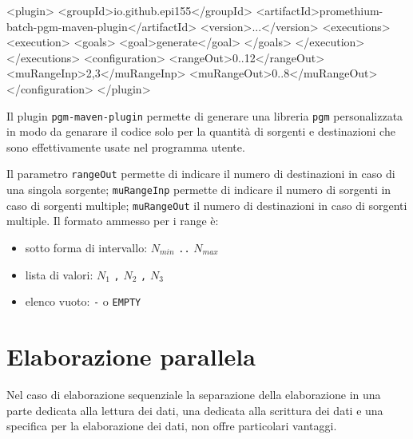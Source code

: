 \begin{elisting}[!htb]
\begin{xmlcode}
<plugin>
    <groupId>io.github.epi155</groupId>
    <artifactId>promethium-batch-pgm-maven-plugin</artifactId>
    <version>...</version>
    <executions>
        <execution>
            <goals>
                <goal>generate</goal>
            </goals>
        </execution>
    </executions>
    <configuration>
        <rangeOut>0..12</rangeOut>
        <muRangeInp>2,3</muRangeInp>
        <muRangeOut>0..8</muRangeOut>
    </configuration>
</plugin>
\end{xmlcode}
\caption{plugin per generare il codice della libreria}
\label{lst:plugin-conf}
\end{elisting}
Il plugin \texttt{pgm-maven-plugin} permette di generare una libreria
\texttt{pgm} personalizzata in modo da genarare il codice solo per la quantità
di sorgenti e destinazioni che sono effettivamente usate nel programma utente.

Il parametro \texttt{rangeOut} permette di indicare il numero di destinazioni in
caso di una singola sorgente; \texttt{muRangeInp} permette di indicare il numero
di sorgenti in caso di sorgenti multiple; \texttt{muRangeOut} il numero di
destinazioni in caso di sorgenti multiple.
Il formato ammesso per i range è:
\begin{itemize}
\item sotto forma di intervallo: $N_{min}$ \verb!..! $N_{max}$
\item lista di valori: $N_1$ \verb!,! $N_2$ \verb!,! $N_3$
\item elenco vuoto: \verb!-! o \verb!EMPTY!
\end{itemize}


\section{Elaborazione parallela} \label{sec:exePar}

Nel caso di elaborazione sequenziale la separazione della elaborazione in una
parte dedicata alla lettura dei dati, una dedicata alla scrittura dei dati e una
specifica per la elaborazione dei dati, non offre particolari vantaggi.

